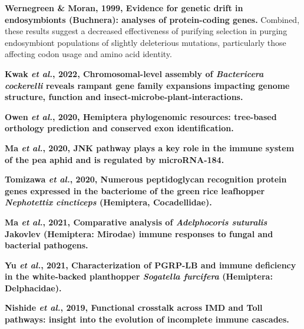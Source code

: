 \documentclass[11pt]{article}
\begin{document}
\begin{sloppypar}
\par
\textbf{Wernegreen & Moran, 1999, Evidence for genetic drift in endosymbionts (Buchnera): analyses of protein-coding genes.} \newline
Combined, these results suggest a decreased effectiveness of purifying selection in purging endosymbiont populations of slightly deleterious mutations, particularly those affecting codon usage and amino acid identity.
\par
\textbf{Kwak \textit{et al.}, 2022, Chromosomal-level assembly of \textit{Bactericera cockerelli} reveals rampant gene family expansions impacting genome structure, function and insect-microbe-plant-interactions.} \newline
\par
\textbf{Owen \textit{et al.}, 2020, Hemiptera phylogenomic resources: tree-based orthology prediction and conserved exon identification.} \newline
\par
\textbf{Ma \textit{et al.}, 2020, JNK pathway plays a key role in the immune system of the pea aphid and is regulated by microRNA-184.} \newline
\par
\textbf{Tomizawa \textit{et al.}, 2020, Numerous peptidoglycan recognition protein genes expressed in the bacteriome of the green rice leafhopper \textit{Nephotettix cincticeps} (Hemiptera, Cocadellidae).} \newline
\par
\textbf{Ma \textit{et al.}, 2021, Comparative analysis of \textit{Adelphocoris suturalis} Jakovlev (Hemiptera: Mirodae) immune responses to fungal and bacterial pathogens.} \newline
\par
\textbf{Yu \textit{et al.}, 2021, Characterization of PGRP-LB and immune deficiency in the white-backed planthopper \textit{Sogatella furcifera} (Hemiptera: Delphacidae).} \newline
\par
\textbf{Nishide \textit{et al.}, 2019, Functional crosstalk across IMD and Toll pathways: insight into the evolution of incomplete immune cascades.}
\end{sloppypar}
\end{document}
